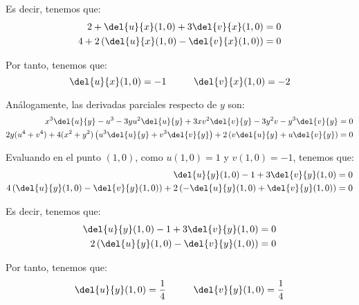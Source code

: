\begin{ejercicio}
    Es decir, tenemos que:
    \begin{align*}
        2 + \del{u}{x}(1,0) + 3\del{v}{x}(1,0) &= 0 \\
        4 + 2\left(\del{u}{x}(1,0) - \del{v}{x}(1,0)\right) &= 0
    \end{align*}

    Por tanto, tenemos que:
    \begin{equation*}
        \del{u}{x}(1,0) = -1 \hspace{1cm}
        \del{v}{x}(1,0) = -2
    \end{equation*}

    Análogamente, las derivadas parciales respecto de $y$ son:
    \begin{align*}
        x^3\del{u}{y} -u^3  -3yu^2\del{u}{y} + 3xv^2\del{v}{y} -3y^2v - y^3\del{v}{y} &= 0 \\
        2y(u^4+v^4) + 4(x^2+y^2)\left(u^3\del{u}{y} + v^3\del{v}{y}\right) + 2\left(v\del{u}{y} + u\del{v}{y}\right) &= 0
    \end{align*}

    Evaluando en el punto $(1,0)$, como $u(1,0)=1$ y $v(1,0)=-1$, tenemos que:
    \begin{align*}
        \del{u}{y}(1,0) -1 + 3\del{v}{y}(1,0) &= 0 \\
        4\left(\del{u}{y}(1,0) -\del{v}{y}(1,0)\right) + 2\left(-\del{u}{y}(1,0) + \del{v}{y}(1,0)\right) &= 0
    \end{align*}

    Es decir, tenemos que:
    \begin{align*}
        \del{u}{y}(1,0) -1 + 3\del{v}{y}(1,0) &= 0 \\
        2\left(\del{u}{y}(1,0) -\del{v}{y}(1,0)\right) &= 0
    \end{align*}

    Por tanto, tenemos que:
    \begin{equation*}
        \del{u}{y}(1,0) = \frac{1}{4} \hspace{1cm}
        \del{v}{y}(1,0) = \frac{1}{4}
    \end{equation*}
\end{ejercicio}



